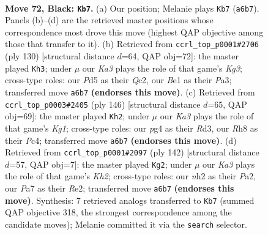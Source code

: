 \documentclass[11pt]{article}
\begin{document}
\clearpage

\begin{figure}[p]\centering
\begin{subfigure}{0.46\textwidth}\centering
\resizebox{\linewidth}{!}{%
\newchessgame
\chessboard[
  setfen={5r1r/p5p1/kq5p/3p3P/Q2P2P1/4P3/7N/4b2K b - - 0 72},
  showmover=false,
  pgfstyle=straightmove, color=movearrow, markmove={a6-b7}
]}
\caption{}
\end{subfigure}\hfill
\begin{subfigure}{0.46\textwidth}\centering
\resizebox{\linewidth}{!}{%
\newchessgame
\chessboard[
  setfen={8/7k/1P4pp/2nbB3/p3P1PP/P1R3K1/2Q5/6q1 w - - 1 66},
  showmover=false,
  pgfstyle=straightmove, color=movearrow, markmove={g3-h3}
]}
\caption{}
\end{subfigure}
\\[4pt]
\begin{subfigure}{0.46\textwidth}\centering
\resizebox{\linewidth}{!}{%
\newchessgame
\chessboard[
  setfen={8/5Pk1/p5p1/5p1r/1pP4p/1P1R1Q1P/6P1/4q1K1 w - - 4 74},
  showmover=false,
  pgfstyle=straightmove, color=movearrow, markmove={g1-h2}
]}
\caption{}
\end{subfigure}\hfill
\begin{subfigure}{0.46\textwidth}\centering
\resizebox{\linewidth}{!}{%
\newchessgame
\chessboard[
  setfen={5bk1/5p2/5qp1/7p/1p2Q2P/pP4P1/P3R2K/8 w - - 66 72},
  showmover=false,
  pgfstyle=straightmove, color=movearrow, markmove={h2-g2}
]}
\caption{}
\end{subfigure}
\caption{\textbf{Move 72, Black: \texttt{Kb7}.} (a) Our position; Melanie plays \texttt{Kb7} (\texttt{a6b7}). Panels (b)--(d) are the retrieved master positions whose correspondence most drove this move (highest QAP objective among those that transfer to it). (b) Retrieved from \texttt{ccrl\_top\_p0001\#2706} (ply 130) [structural distance $d$=64, QAP obj=72]: the master played \texttt{Kh3}; under $\mu$ our \emph{Ka3} plays the role of that game's \emph{Kg3}; cross-type roles: our \emph{P}d5 as their \emph{Q}c2, our \emph{B}e1 as their \emph{P}a3; transferred move \texttt{a6b7} \textbf{(endorses this move)}. (c) Retrieved from \texttt{ccrl\_top\_p0003\#2405} (ply 146) [structural distance $d$=65, QAP obj=69]: the master played \texttt{Kh2}; under $\mu$ our \emph{Ka3} plays the role of that game's \emph{Kg1}; cross-type roles: our \emph{p}g4 as their \emph{R}d3, our \emph{R}h8 as their \emph{P}c4; transferred move \texttt{a6b7} \textbf{(endorses this move)}. (d) Retrieved from \texttt{ccrl\_top\_p0001\#2097} (ply 142) [structural distance $d$=57, QAP obj=7]: the master played \texttt{Kg2}; under $\mu$ our \emph{Ka3} plays the role of that game's \emph{Kh2}; cross-type roles: our \emph{n}h2 as their \emph{P}a2, our \emph{P}a7 as their \emph{R}e2; transferred move \texttt{a6b7} \textbf{(endorses this move)}. Synthesis: 7 retrieved analogs transferred to \texttt{Kb7} (summed QAP objective 318, the strongest correspondence among the candidate moves); Melanie committed it via the \texttt{search} selector.}
\label{fig:thought-m143}
\end{figure}
\end{document}
